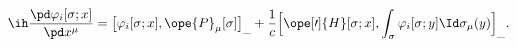 \begin{equation}	\label{12.50}
\ih\frac{\pd \varphi_i[\sigma;x] }{\pd x^\mu}
=
\bigl[ \varphi_i[\sigma;x] , \ope{P}_\mu[\sigma]
\bigr]_{\_}
+
\frac{1}{c} \Bigl[\ope[\prime]{H}[\sigma;x] ,
	\int_\sigma \varphi_i[\sigma;y] \Id\sigma_\mu(y) \Bigr]_{\_} .
	\end{equation}

